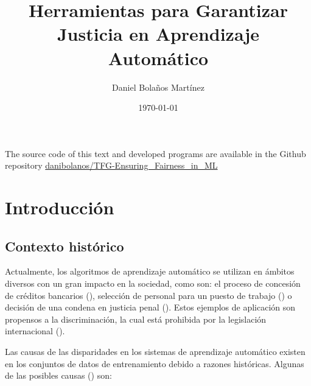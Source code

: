 \documentclass[oneside,openright,titlepage,numbers=noenddot,openany,headinclude,footinclude=true,
cleardoublepage=empty,abstractoff,BCOR=5mm,paper=a4,fontsize=12pt,main=spanish]{scrreprt}
\author{Daniel Bolaños Martínez}
\date{\today}
\title{Herramientas para Garantizar \\Justicia en Aprendizaje Automático}
\begin{document}
\maketitle



\newpage
\vspace*{\fill}
\doclicenseThis
The source code of this text and developed programs are available in the Github repository \href{https://github.com/danibolanos/TFG-Ensuring_Fairness_in_ML.git}{danibolanos/TFG-Ensuring\_Fairness\_in\_ML}









\tableofcontents


\chapter{Introducción}

\section{Contexto histórico}

Actualmente, los algoritmos de aprendizaje automático se utilizan en ámbitos diversos con un gran impacto en la sociedad, como son: el proceso de concesión de créditos bancarios (\cite{prestamo2018}), selección de personal para un puesto de trabajo (\cite{contratar2015}) o decisión de una condena en justicia penal (\cite{condena2016}). Estos ejemplos de aplicación son propensos a la discriminación, la cual está prohibida por la legislación internacional (\cite{ley1964}). 

Las causas de las disparidades en los sistemas de aprendizaje automático existen en los conjuntos de datos de entrenamiento debido a razones históricas. Algunas de las posibles causas (\cite{bigdata2016}) son:
\end{document}
